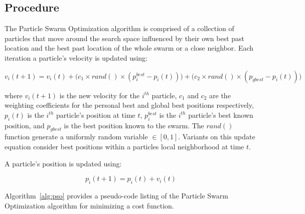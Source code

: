 \subsection{Procedure}
The Particle Swarm Optimization algorithm is comprised of a collection of particles that move around the search space influenced by their own best past location and the best past location of the whole swarm or a close neighbor. Each iteration a particle's velocity is updated using:

\begin{equation}
	v_{i}(t+1) = v_{i}(t) + 
	\big( c_1 \times rand() \times (p_{i}^{best} - p_{i}(t)) \big) + 
	\big( c_2 \times rand() \times (p_{gbest} - p_{i}(t)) \big)
\end{equation}

where $v_{i}(t+1)$ is the new velocity for the $i^{th}$ particle, $c_1$ and $c_2$ are the weighting coefficients for the personal best and global best positions respectively, $p_{i}(t)$ is the $i^{th}$ particle's position at time $t$, $p_{i}^{best}$ is the $i^{th}$ particle's best known position, and $p_{gbest}$ is the best position known to the swarm. The $rand()$ function generate a uniformly random variable $\in [0,1]$. Variants on this update equation consider best positions within a particles local neighborhood at time $t$.

A particle's position is updated using:

\begin{equation}
	p_{i}(t+1) = p_{i}(t) + v_{i}(t)
\end{equation}

Algorithm~\ref{alg:pso} provides a pseudo-code listing of the Particle Swarm Optimization algorithm for minimizing a cost function. 

